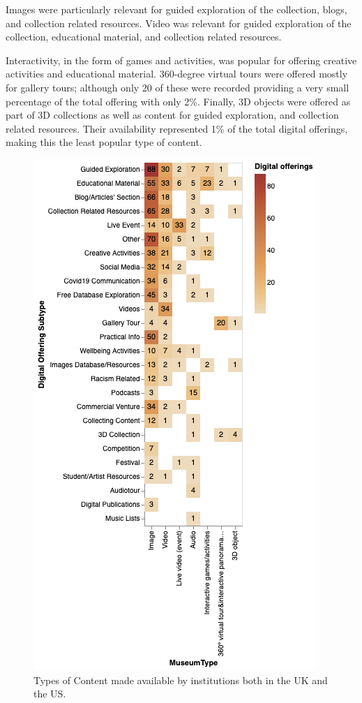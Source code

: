 \documentclass{egpubl}
\begin{document}
Images were particularly relevant for guided exploration of the collection, blogs, and collection related resources. Video was relevant for guided exploration of the collection, educational material, and  collection related resources. 

Interactivity, in the form of games and activities, was popular for offering creative activities and educational material. 360-degree virtual tours were offered mostly for gallery tours; although only 20 of these were recorded providing a very small percentage of the total offering with only 2\%. Finally, 3D objects were offered as part of 3D collections  as well as content for guided exploration, and collection related resources. Their availability represented 1\% of the total digital offerings, making this the least popular type of content. 
 
\begin{figure}[h]
  \centering
  \includegraphics[width=\linewidth]{images/typescontent.png}
  \caption{\label{fig:contenttype}
            Types of Content made available by institutions both in the UK and the US.}
\end{figure}
\end{document}
